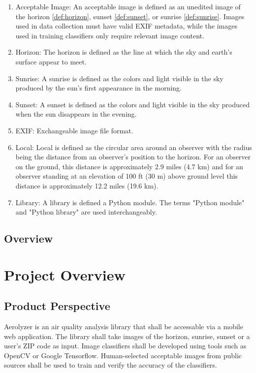 \documentclass[journal,10pt,draftclsnofoot,onecolumn]{IEEEtran}
\begin{document}
\begin{singlespace}
\begin{enumerate}
			\item \label{def:accImg} Acceptable Image: An acceptable image is defined as an unedited image of the horizon \ref{def:horizon}, sunset \ref{def:sunset}, or sunrise \ref{def:sunrise}.
			Images used in data collection must have valid EXIF metadata, while the images used in training classifiers only require relevant image content.

			\item \label{def:horizon} Horizon: The horizon is defined as the line at which the sky and earth's surface appear to meet.

			\item \label{def:sunrise} Sunrise: A sunrise is defined as the colors and light visible in the sky produced by the sun's first appearance in the morning.

			\item \label{def:sunset} Sunset: A sunset is defined as the colors and light visible in the sky produced when the sun disappears in the evening.

			\item \label{def:exif} EXIF: Exchangeable image file format.

			\item \label{def:local} Local: Local is defined as the circular area around an observer with the radius being the distance from an observer's position to the horizon. For an observer on the ground, this distance is approximately 2.9 miles (4.7 km) and for an observer standing at an elevation of 100 ft (30 m) above ground level this distance is approximately 12.2 miles (19.6 km).

			\item \label{def:lib} Library: A library is defined a Python module. The terms "Python module" and "Python library" are used interchangeably.
		\end{enumerate}

	\nocite{*}
	
	

	\subsection{Overview}

\clearpage

\section{Project Overview}

	\subsection{Product Perspective}
		Aerolyzer is an air quality analysis library that shall be accessable via a mobile web application.
		The library shall take images of the horizon, sunrise, sunset or a user's ZIP code as input.
		Image classifiers shall be developed using tools such as OpenCV or Google Tensorflow.
		Human-selected acceptable images from public sources shall be used to train and verify the accuracy of the classifiers.


\end{singlespace}
\end{document}
